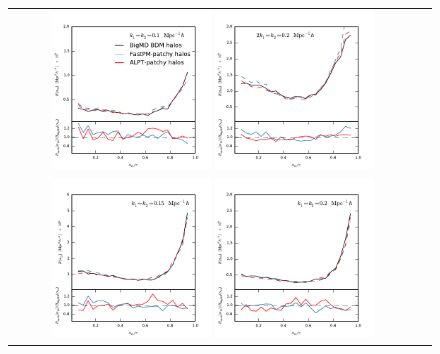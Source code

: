 \begin{figure}
\vspace{-0.5cm}
\begin{tabular}{cc}
\includegraphics[width=0.4\textwidth]{figures/mocks/bispec1.pdf}
\includegraphics[width=0.4\textwidth]{figures/mocks/bispec3.pdf}
\vspace{-0.8cm}
\\
\includegraphics[width=0.4\textwidth]{figures/mocks/bispec2.pdf}
\includegraphics[width=0.4\textwidth]{figures/mocks/bispec5.pdf}

\end{tabular}
\end{figure}
